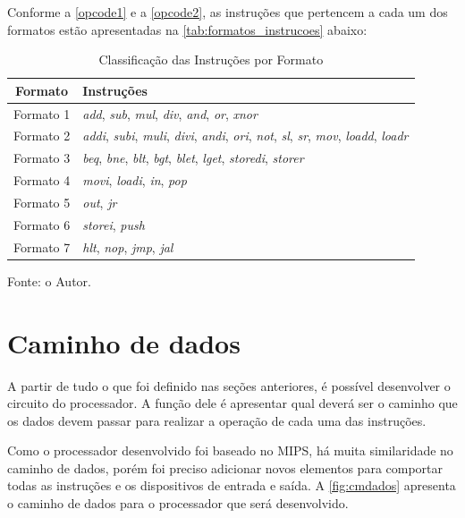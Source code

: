 \documentclass[
	12pt,				%
	oneside,
	a4paper,			%
	english,			%
	french,				%
	spanish,			%
	brazil,				%
	]{abntex2}
\begin{document}
Conforme a \autoref{opcode1} e a \autoref{opcode2}, as instruções que pertencem a cada um dos formatos estão apresentadas na \autoref{tab:formatos_instrucoes} abaixo:

\setlength{\tabcolsep}{10pt} %
\begin{table}[H]
\centering
\caption{Classificação das Instruções por Formato}
\label{tab:formatos_instrucoes}
\begin{tabular}{|c|l|}
\hline
\textbf{Formato} & \textbf{Instruções} \\
\hline
Formato 1 & \textit{add}, \textit{sub}, \textit{mul}, \textit{div}, \textit{and}, \textit{or}, \textit{xnor} \\
\hline
Formato 2 & \textit{addi}, \textit{subi}, \textit{muli}, \textit{divi}, \textit{andi}, \textit{ori}, \textit{not}, \textit{sl}, \textit{sr}, \textit{mov}, \textit{loadd}, \textit{loadr} \\
\hline
Formato 3 & \textit{beq}, \textit{bne}, \textit{blt}, \textit{bgt}, \textit{blet}, \textit{lget}, \textit{storedi}, \textit{storer} \\
\hline
Formato 4 & \textit{movi}, \textit{loadi}, \textit{in}, \textit{pop} \\
\hline
Formato 5 &  \textit{out}, \textit{jr} \\
\hline
Formato 6 & \textit{storei}, \textit{push}  \\
\hline
Formato 7 & \textit{hlt}, \textit{nop}, \textit{jmp}, \textit{jal} \\
\hline
\end{tabular}
\vspace{-0.5em}
\begin{center}
Fonte: o Autor.
\end{center}
\end{table}

\section{Caminho de dados}
A partir de tudo o que foi definido nas seções anteriores, é possível desenvolver o circuito do processador. A função dele é apresentar qual deverá ser o caminho que os dados devem passar para realizar a operação de cada uma das instruções.

Como o processador desenvolvido foi baseado no MIPS, há muita similaridade no caminho de dados, porém foi preciso adicionar novos elementos para comportar todas as instruções e os dispositivos de entrada e saída. A \autoref{fig:cmdados} apresenta o caminho de dados para o processador que será desenvolvido.
\end{document}
